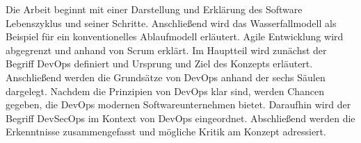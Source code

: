Die Arbeit beginnt mit einer Darstellung und Erklärung des Software Lebenszyklus und seiner
Schritte. Anschließend wird das Wasserfallmodell als Beispiel für ein konventionelles Ablaufmodell
erläutert. Agile Entwicklung wird abgegrenzt und anhand von Scrum erklärt.
Im Hauptteil wird zunächst der Begriff DevOps definiert und Ursprung und Ziel des Konzepts
erläutert. Anschließend werden die Grundsätze von DevOps anhand der sechs Säulen dargelegt.
Nachdem die Prinzipien von DevOps klar sind, werden Chancen gegeben, die DevOps modernen
Softwareunternehmen bietet. Daraufhin wird der Begriff DevSecOps im Kontext von DevOps eingeordnet.
Abschließend werden die Erkenntnisse zusammengefasst und mögliche Kritik am Konzept adressiert.